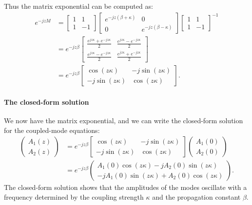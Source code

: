\documentclass[10pt, a4paper]{article}
\begin{document}
Thus the matrix exponential can be computed as:
\begin{align}
e^{-jzM} &= \begin{bmatrix}
1 & 1 \\
1 & -1
\end{bmatrix}
\begin{bmatrix}
e^{-jz(\beta + \kappa)} & 0 \\
0 & e^{-jz(\beta - \kappa)}
\end{bmatrix}
\begin{bmatrix}1 & 1 \\
1 & -1\end{bmatrix}^{-1}\\
&=
e^{-jz\beta}
\begin{bmatrix}
\frac{e^{jz\kappa} + e^{-jz\kappa}}{2} & \frac{e^{jz\kappa} - e^{-jz\kappa}}{2} \\
\frac{e^{jz\kappa} - e^{-jz\kappa}}{2} & \frac{e^{jz\kappa} + e^{-jz\kappa}}{2}
\end{bmatrix}
\\
&=e^{-jz\beta}
\begin{bmatrix}
\cos(z\kappa) & -j\sin(z\kappa) \\
-j\sin(z\kappa) & \cos(z\kappa)
\end{bmatrix}.
\end{align}

\paragraph{The closed-form solution} We now have the matrix exponential, and we can write the closed-form solution for the coupled-mode equations:
\begin{align}
\begin{pmatrix}
A_1(z)\\
A_2(z)
\end{pmatrix}
&=
e^{-jz\beta}
\begin{bmatrix}
\cos(z\kappa) & -j\sin(z\kappa) \\
-j\sin(z\kappa) & \cos(z\kappa)
\end{bmatrix}
\begin{pmatrix}
A_1(0)\\
A_2(0)
\end{pmatrix}\\
&=
e^{-jz\beta} \begin{pmatrix}
A_1(0)\cos(z\kappa) - jA_2(0)\sin(z\kappa) \\
-jA_1(0)\sin(z\kappa) + A_2(0)\cos(z\kappa)
\end{pmatrix}.
\end{align}
The closed-form solution shows that the amplitudes of the modes oscillate with a frequency determined by the coupling strength $\kappa$ and the propagation constant $\beta$.
\end{document}
